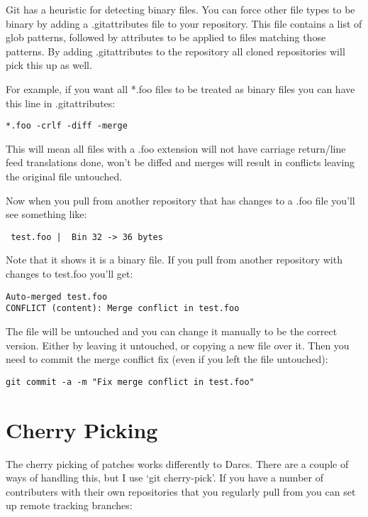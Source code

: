 Git has a heuristic for detecting binary files. You can force other
file types to be binary by adding a .gitattributes file to your
repository. This file contains a list of glob patterns, followed by
attributes to be applied to files matching those patterns. By adding
.gitattributes to the repository all cloned repositories will pick
this up as well.

For example, if you want all *.foo files to be treated as binary files
you can have this line in .gitattributes:

\begin{verbatim}
*.foo -crlf -diff -merge
\end{verbatim}

This will mean all files with a .foo extension will not have carriage
return/line feed translations done, won't be diffed and merges will
result in conflicts leaving the original file untouched.

Now when you pull from another repository that has changes to a .foo
file you'll see something like:

\begin{verbatim}
 test.foo |  Bin 32 -> 36 bytes
\end{verbatim}

Note that it shows it is a binary file. If you pull from another
repository with changes to test.foo you'll get:

\begin{verbatim}
Auto-merged test.foo
CONFLICT (content): Merge conflict in test.foo
\end{verbatim}

The file will be untouched and you can change it manually to be the
correct version. Either by leaving it untouched, or copying a new file
over it. Then you need to commit the merge conflict fix (even if you
left the file untouched):

\begin{verbatim}
git commit -a -m "Fix merge conflict in test.foo"
\end{verbatim}

\section{Cherry Picking}

The cherry picking of patches works differently to Darcs. There are a
couple of ways of handling this, but I use `git cherry-pick'. If you
have a number of contributers with their own repositories that you
regularly pull from you can set up remote tracking branches:

